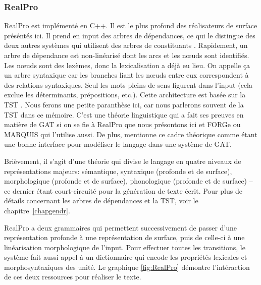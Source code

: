 \subsubsection{RealPro}
RealPro \citep{LavoieFastPortableRealizer1997} est implémenté en C++. Il est le plus profond des réalisateurs de surface préséntés ici. Il prend en input des arbres de dépendances, ce qui le distingue des deux autres systèmes qui utilisent des arbres de constituants \citep{DBLP:conf/enlg/MolinsL15,GattSimpleNLGRealisationEngine2009}. Rapidement, un arbre de dépendance est non-linéarisé dont les arcs et les n\oe{}uds sont identifiés. Les n\oe{}uds sont des lexèmes, donc la lexicalisation a déjà eu lieu. On appelle ça un arbre syntaxique car les branches liant les n\oe{}uds entre eux correspondent à des relations syntaxiques. Seul les mots pleins de sens figurent dans l'input (cela exclue les déterminants, prépositions, etc.). Cette architecture est basée sur la \ac{TST} \citep{melcuk1988}. Nous ferons une petite paranthèse ici, car nous parlerons souvent de la \ac{TST} dans ce mémoire. C'est une théorie linguistique qui a fait ses preuves en matière de \ac{GAT} si on se fie à RealPro \citep{LavoieFastPortableRealizer1997} que nous présontons ici et FORGe \citep{MilledemoFORGePompeu2017} ou MARQUIS \citep{WannerMARQUISGENERATIONUSERTAILORED2010} qui l'utilise aussi. De plus, \cite{Vicentegeneracionlenguajenatural2015} mentionne ce cadre théorique comme étant une bonne interface pour modéliser le langage dans une système de \ac{GAT}.

Brièvement, il s'agit d'une théorie qui divise le langage en quatre niveaux de représentations majeurs: sémantique, syntaxique (profonde et de surface), morphologique (profonde et de surface), phonologique (profonde et de surface) -- ce dernier étant court-circuité pour la génération de texte écrit. Pour plus de détails concernant les arbres de dépendances et la \ac{TST}, voir le chapitre~\ref{chapgendr}.

RealPro a deux grammaires qui permettent successivement de passer d'une représentation profonde à une représentation de surface, puis de celle-ci à une linéarisation morphologique de l'input. Pour effectuer toutes les transitions, le système fait aussi appel à un dictionnaire qui encode les propriétés lexicales et morphosyntaxiques des unité. Le graphique \ref{fig:RealPro} démontre l'intéraction de ces deux ressources pour réaliser le texte.

